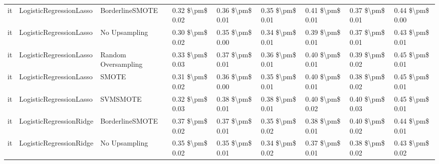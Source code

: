 \begin{tabular}{lllllllll}
      it &         LogisticRegressionLasso &               BorderlineSMOTE & 0.32 \$\textbackslash pm\$ 0.02 &           0.36 \$\textbackslash pm\$ 0.01 &       0.35 \$\textbackslash pm\$ 0.01 &        0.41 \$\textbackslash pm\$ 0.01 &                         0.37 \$\textbackslash pm\$ 0.01 &     0.44 \$\textbackslash pm\$ 0.00 \\
      it &         LogisticRegressionLasso &                 No Upsampling & 0.30 \$\textbackslash pm\$ 0.02 &           0.35 \$\textbackslash pm\$ 0.00 &       0.34 \$\textbackslash pm\$ 0.01 &        0.39 \$\textbackslash pm\$ 0.01 &                         0.37 \$\textbackslash pm\$ 0.01 &     0.43 \$\textbackslash pm\$ 0.01 \\
      it &         LogisticRegressionLasso &           Random Oversampling & 0.33 \$\textbackslash pm\$ 0.03 &           0.37 \$\textbackslash pm\$ 0.01 &       0.36 \$\textbackslash pm\$ 0.01 &        0.40 \$\textbackslash pm\$ 0.01 &                         0.39 \$\textbackslash pm\$ 0.02 &     0.45 \$\textbackslash pm\$ 0.01 \\
      it &         LogisticRegressionLasso &                         SMOTE & 0.31 \$\textbackslash pm\$ 0.02 &           0.36 \$\textbackslash pm\$ 0.00 &       0.35 \$\textbackslash pm\$ 0.01 &        0.40 \$\textbackslash pm\$ 0.01 &                         0.38 \$\textbackslash pm\$ 0.02 &     0.45 \$\textbackslash pm\$ 0.01 \\
      it &         LogisticRegressionLasso &                      SVMSMOTE & 0.32 \$\textbackslash pm\$ 0.03 &           0.38 \$\textbackslash pm\$ 0.01 &       0.38 \$\textbackslash pm\$ 0.01 &        0.40 \$\textbackslash pm\$ 0.02 &                         0.40 \$\textbackslash pm\$ 0.03 &     0.45 \$\textbackslash pm\$ 0.01 \\
      it &         LogisticRegressionRidge &               BorderlineSMOTE & 0.37 \$\textbackslash pm\$ 0.02 &           0.37 \$\textbackslash pm\$ 0.01 &       0.35 \$\textbackslash pm\$ 0.02 &        0.38 \$\textbackslash pm\$ 0.01 &                         0.40 \$\textbackslash pm\$ 0.02 &     0.44 \$\textbackslash pm\$ 0.01 \\
      it &         LogisticRegressionRidge &                 No Upsampling & 0.35 \$\textbackslash pm\$ 0.02 &           0.35 \$\textbackslash pm\$ 0.01 &       0.34 \$\textbackslash pm\$ 0.02 &        0.37 \$\textbackslash pm\$ 0.01 &                         0.38 \$\textbackslash pm\$ 0.02 &     0.43 \$\textbackslash pm\$ 0.02 \\

\end{tabular}
